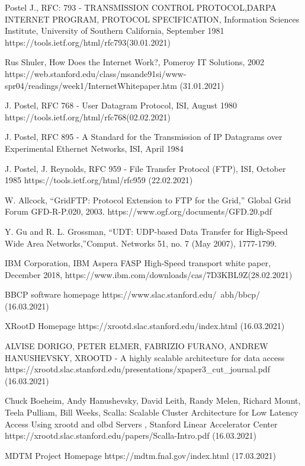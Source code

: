 \documentclass[magisterska,en]{pracamgr}
\begin{document}
\begin{thebibliography}{9}
Postel J., RFC: 793 - TRANSMISSION CONTROL PROTOCOL,DARPA INTERNET PROGRAM, PROTOCOL SPECIFICATION, Information Sciences Institute, University of Southern California, September 1981
https://tools.ietf.org/html/rfc793(30.01.2021)


Rus Shuler, How Does the Internet Work?, Pomeroy IT Solutions, 2002
https://web.stanford.edu/class/msande91si/www-spr04/readings/week1/InternetWhitepaper.htm (31.01.2021)

J. Postel, RFC 768 - User Datagram Protocol, ISI, August 1980
https://tools.ietf.org/html/rfc768(02.02.2021)

J. Postel, RFC 895 - A Standard for the Transmission of IP Datagrams over Experimental Ethernet Networks, ISI, April 1984

J. Postel, J. Reynolds, RFC 959 - File Transfer Protocol (FTP), ISI, October 1985
https://tools.ietf.org/html/rfc959 (22.02.2021)

W. Allcock, “GridFTP: Protocol Extension to FTP for the Grid,” Global Grid Forum GFD-R-P.020, 2003.
https://www.ogf.org/documents/GFD.20.pdf

Y. Gu  and  R.  L.  Grossman, “UDT:  UDP-based  Data  Transfer  for  High-Speed  Wide  Area Networks,”Comput. Networks 51, no. 7 (May 2007), 1777-1799.

IBM Corporation, IBM Aspera FASP High-Speed transport white paper, December 2018, https://www.ibm.com/downloads/cas/7D3KBL9Z(28.02.2021)

BBCP software homepage
https://www.slac.stanford.edu/~abh/bbcp/ (16.03.2021)

XRootD Homepage
https://xrootd.slac.stanford.edu/index.html (16.03.2021)

ALVISE DORIGO, PETER ELMER, FABRIZIO FURANO, ANDREW HANUSHEVSKY, XROOTD - A highly scalable architecture for data access
https://xrootd.slac.stanford.edu/presentations/xpaper3\_cut\_journal.pdf (16.03.2021)

Chuck Boeheim, Andy Hanushevsky, David Leith, Randy Melen,  Richard Mount, Teela Pulliam, Bill Weeks, Scalla: Scalable Cluster Architecture for Low Latency Access Using xrootd and olbd Servers , Stanford Linear Accelerator Center
https://xrootd.slac.stanford.edu/papers/Scalla-Intro.pdf (16.03.2021)

MDTM Project Homepage
https://mdtm.fnal.gov/index.html (17.03.2021)


\end{thebibliography}
\end{document}
